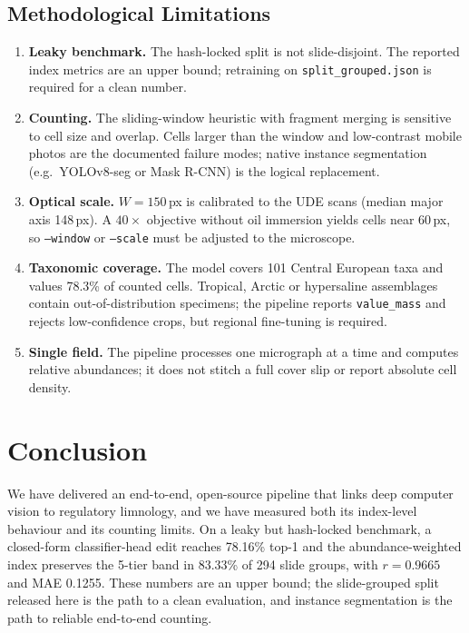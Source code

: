 \documentclass[10pt,twocolumn,a4paper]{article}
\begin{document}
\subsection{Methodological Limitations}
\begin{enumerate}
    \item \textbf{Leaky benchmark.} The hash-locked split is not slide-disjoint. The reported index metrics are an upper bound; retraining on \texttt{split\_grouped.json} is required for a clean number.
    \item \textbf{Counting.} The sliding-window heuristic with fragment merging is sensitive to cell size and overlap. Cells larger than the window and low-contrast mobile photos are the documented failure modes; native instance segmentation (e.g.\ YOLOv8-seg or Mask R-CNN) is the logical replacement.
    \item \textbf{Optical scale.} $W = 150$\,px is calibrated to the UDE scans (median major axis 148\,px). A $40\times$ objective without oil immersion yields cells near 60\,px, so \texttt{--window} or \texttt{--scale} must be adjusted to the microscope.
    \item \textbf{Taxonomic coverage.} The model covers 101 Central European taxa and values 78.3\% of counted cells. Tropical, Arctic or hypersaline assemblages contain out-of-distribution specimens; the pipeline reports \texttt{value\_mass} and rejects low-confidence crops, but regional fine-tuning is required.
    \item \textbf{Single field.} The pipeline processes one micrograph at a time and computes relative abundances; it does not stitch a full cover slip or report absolute cell density.
\end{enumerate}

\section{Conclusion}
We have delivered an end-to-end, open-source pipeline that links deep computer vision to regulatory limnology, and we have measured both its index-level behaviour and its counting limits. On a leaky but hash-locked benchmark, a closed-form classifier-head edit reaches 78.16\% top-1 and the abundance-weighted index preserves the 5-tier band in 83.33\% of 294 slide groups, with $r = 0.9665$ and MAE 0.1255. These numbers are an upper bound; the slide-grouped split released here is the path to a clean evaluation, and instance segmentation is the path to reliable end-to-end counting.
\end{document}
